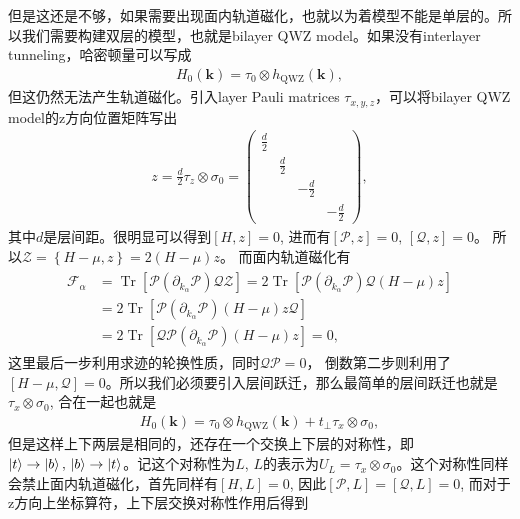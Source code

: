 \documentclass[10pt, oneside]{article}
\begin{document}
但是这还是不够，如果需要出现面内轨道磁化，也就以为着模型不能是单层的。所以我们需要构建双层的模型，也就是bilayer QWZ model。如果没有interlayer tunneling，哈密顿量可以写成
\begin{align}
	H_{0} \left(\bm{k }\right) = \tau_{0} \otimes h_{\mathrm{QWZ}} \left(\bm{k }\right),
\end{align}
但这仍然无法产生轨道磁化。引入layer Pauli matrices \(\tau_{x,y,z}\)，可以将bilayer QWZ model的z方向位置矩阵写出
\begin{align}
	z = \frac{d}{2} \tau_{z} \otimes \sigma_{0} = \begin{pmatrix}
		\frac{d}{2} & & & \\ & \frac{d}{2} & & \\ & & -\frac{d}{2} & \\ & & & -\frac{d}{2}
	\end{pmatrix},
\end{align}
其中\(d \)是层间距。很明显可以得到\(\left[H,z\right] = 0\), 进而有\(\left[\mathcal{P}, z\right] =0,\, \left[\mathcal{Q}, z\right] = 0\)。 所以\(\mathcal{Z} = \left\{H -\mu ,z\right\} = 2 \left(H - \mu\right) z\)。 而面内轨道磁化有
\begin{align}
	\begin{split}
		\mathcal{F}_{\alpha} &= \operatorname{Tr} \left[\mathcal{P} \left(\partial_{k_{\alpha}} \mathcal{P}\right) \mathcal{Q} \mathcal{Z} \right] = 2 \operatorname{Tr}\left[\mathcal{P} \left(\partial_{k_{\alpha}} \mathcal{P}\right)  \mathcal{Q} \left(H - \mu\right) z \right] \\
		& =  2 \operatorname{Tr}\left[\mathcal{P} \left(\partial_{k_{\alpha}} \mathcal{P}\right)  \left(H - \mu\right) z  \mathcal{Q} \right] \\
		& = 2 \operatorname{Tr}\left[  \mathcal{Q} \mathcal{P} \left(\partial_{k_{\alpha}} \mathcal{P}\right)  \left(H - \mu\right) z  \right] = 0,
	\end{split}
\end{align}
这里最后一步利用求迹的轮换性质，同时\(\mathcal{Q}\mathcal{P} = 0\)， 倒数第二步则利用了\(\left[H - \mu, \mathcal{Q}\right] = 0\)。所以我们必须要引入层间跃迁，那么最简单的层间跃迁也就是\(\tau_{x } \otimes \sigma_{0}\), 合在一起也就是
\begin{align}
	H_{0} \left(\bm{k }\right) = \tau_{0} \otimes h_{\mathrm{QWZ}} \left(\bm{k}\right) + t_{\perp} \tau_{x } \otimes \sigma_{0},
\end{align}
但是这样上下两层是相同的，还存在一个交换上下层的对称性，即\(\ket{t} \rightarrow \ket{b},	\, \ket{b } \rightarrow \ket{t }	\)。记这个对称性为\(L\), \(L \)的表示为\(U_{L } = \tau_{x } \otimes \sigma_{0}\)。这个对称性同样会禁止面内轨道磁化，首先同样有\(\left[H, L\right] = 0\), 因此\(\left[\mathcal{P}, L \right] = \left[\mathcal{Q}, L\right] = 0\), 而对于z方向上坐标算符，上下层交换对称性作用后得到
\end{document}
